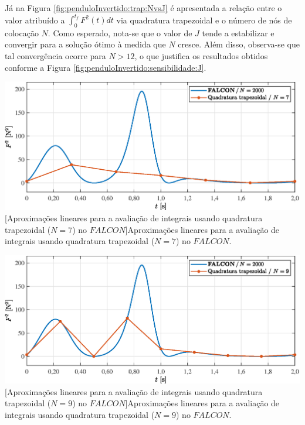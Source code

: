Já na Figura \ref{fig:penduloInvertido:trap:NvsJ} é apresentada a relação entre o valor atribuído a $ \int_{0}^{t_f} F^2(t) dt $ via  quadratura trapezoidal e o número de nós de colocação $ N $. Como esperado, nota-se que o valor de $ J $ tende a estabilizar e convergir para a solução ótimo à medida que $ N $ cresce. Além disso, observa-se que tal convergência ocorre para $ N > 12 $, o que justifica os resultados obtidos conforme a Figura \ref{fig:penduloInvertido:sensibilidade:J}. 

\noindent	
\begin{minipage}{\textwidth}
	\vspace{\onelineskip}
	\centering
	\includegraphics[scale=0.7]{fig/resultados/penduloInvertido/obs/trap/N=7}
	[Aproximações lineares para a avaliação de integrais usando quadratura trapezoidal ($ N = 7 $) no $ FALCON $]{Aproximações lineares para a avaliação de integrais usando quadratura trapezoidal ($ N = 7 $) no $ FALCON $.}
	\label{fig:penduloInvertido:trap:N=7}
	\vspace{\onelineskip}
\end{minipage}

\noindent	
\begin{minipage}{\textwidth}
	\vspace{\onelineskip}
	\centering
	\includegraphics[scale=0.7]{fig/resultados/penduloInvertido/obs/trap/N=9}
	[Aproximações lineares para a avaliação de integrais usando quadratura trapezoidal ($ N = 9 $) no $ FALCON $]{Aproximações lineares para a avaliação de integrais usando quadratura trapezoidal ($ N = 9 $) no $ FALCON $.}
	\label{fig:penduloInvertido:trap:N=9}
	\vspace{\onelineskip}
\end{minipage}

